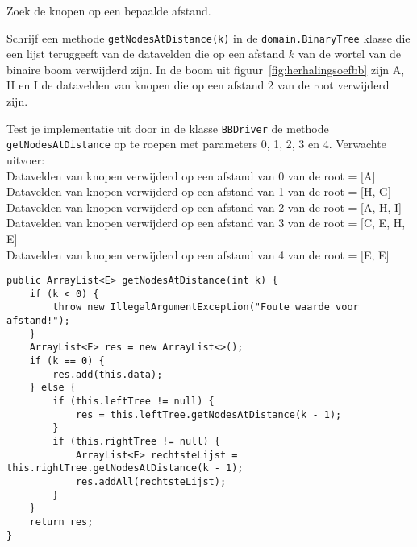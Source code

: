 \begin{oef}
\code Zoek de knopen op een bepaalde afstand.
\begin{oefenumerate}
\item Schrijf een methode \verb=getNodesAtDistance(k)= in de \verb+domain.BinaryTree+ klasse die een lijst teruggeeft van de datavelden die op een afstand $k$ van de wortel van de binaire boom verwijderd zijn. In de boom uit figuur~\ref{fig:herhalingsoefbb} zijn A, H en I de datavelden van knopen die op een afstand 2 van de root verwijderd zijn.
\item Test je implementatie uit door in de klasse \verb+BBDriver+ de methode \verb+getNodesAtDistance+ op te roepen met parameters 0, 1, 2, 3 en 4. Verwachte uitvoer: \\
Datavelden van knopen verwijderd op een afstand van 0 van de root = [A]\\
Datavelden van knopen verwijderd op een afstand van 1 van de root = [H, G]\\
Datavelden van knopen verwijderd op een afstand van 2 van de root = [A, H, I]\\
Datavelden van knopen verwijderd op een afstand van 3 van de root = [C, E, H, E]\\
Datavelden van knopen verwijderd op een afstand van 4 van de root = [E, E]
\end{oefenumerate}

\begin{opl}
\begin{lstlisting}[caption={getNodesAtDistance(k) methode}, label=herhoefbbdistance]
public ArrayList<E> getNodesAtDistance(int k) {
	if (k < 0) {
		throw new IllegalArgumentException("Foute waarde voor afstand!");
	}
	ArrayList<E> res = new ArrayList<>();
	if (k == 0) {
		res.add(this.data);
	} else {
		if (this.leftTree != null) {
			res = this.leftTree.getNodesAtDistance(k - 1);
		}
		if (this.rightTree != null) {
			ArrayList<E> rechtsteLijst = this.rightTree.getNodesAtDistance(k - 1);
			res.addAll(rechtsteLijst);
		}
	}
	return res;
}
\end{lstlisting}
\end{opl}
\end{oef}



